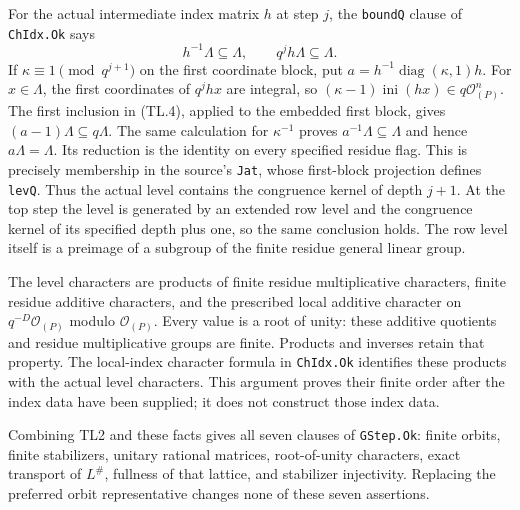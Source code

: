 For the actual intermediate index matrix $h$ at step $j$, the
\texttt{boundQ} clause of \texttt{ChIdx.Ok} says
\[
 h^{-1}\Lambda\subseteq\Lambda,
 \qquad q^j h\Lambda\subseteq\Lambda.             \tag{TL.4}
\]
If $\kappa\equiv1\pmod{q^{j+1}}$ on the first coordinate block,
put $a=h^{-1}\operatorname{diag}(\kappa,1)h$. For $x\in\Lambda$,
the first coordinates of $q^jh x$ are integral, so
$(\kappa-1)\operatorname{ini}(h x)\in q\mathcal O_{(P)}^n$.
The first inclusion in (TL.4), applied to the embedded first block,
gives $(a-1)\Lambda\subseteq q\Lambda$. The same calculation for
$\kappa^{-1}$ proves $a^{-1}\Lambda\subseteq\Lambda$ and hence
$a\Lambda=\Lambda$. Its reduction is the identity on every
specified residue flag. This is precisely membership in the source's
\texttt{Jat}, whose first-block projection defines \texttt{levQ}.
Thus the actual level contains the congruence kernel of depth $j+1$.
At the top step the level is generated by an extended row level and
the congruence kernel of its specified depth plus one, so the same
conclusion holds. The row level itself is a preimage of a subgroup
of the finite residue general linear group.

The level characters are products of finite residue multiplicative
characters, finite residue additive characters, and the prescribed
local additive character on $q^{-D}\mathcal O_{(P)}$ modulo
$\mathcal O_{(P)}$. Every value is a root of unity: these additive
quotients and residue multiplicative groups are finite. Products and
inverses retain that property. The local-index character formula in
\texttt{ChIdx.Ok} identifies these products with the actual level
characters. This argument proves their finite order after the index
data have been supplied; it does not construct those index data.

Combining TL2 and these facts gives all seven clauses of
\texttt{GStep.Ok}: finite orbits, finite stabilizers, unitary rational
matrices, root-of-unity characters, exact transport of $L^\#$, fullness
of that lattice, and stabilizer injectivity. Replacing the preferred
orbit representative changes none of these seven assertions.


